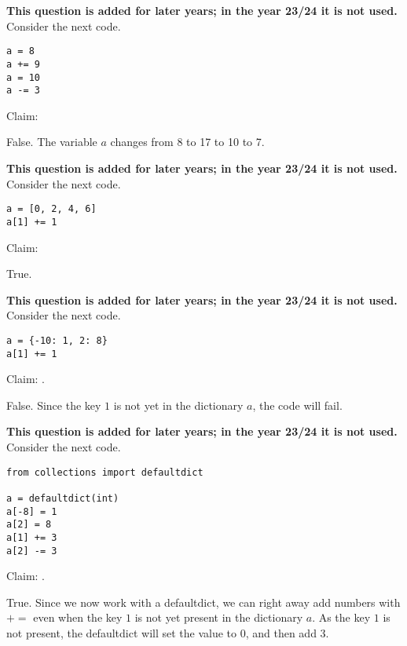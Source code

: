 \documentclass[stochastic-or.tex]{subfiles}
\begin{document}
\begin{truefalse} \textbf{This question is added for later years; in the year 23/24 it is not used.}
Consider the next code.
\begin{verbatim}
a = 8
a += 9
a = 10
a -= 3
\end{verbatim}
Claim:  
\begin{solution}
False. The variable $a$ changes from 8 to 17 to 10 to 7.
\end{solution}
\end{truefalse}

\begin{truefalse} \textbf{This question is added for later years; in the year 23/24 it is not used.}
Consider the next code.
\begin{verbatim}
a = [0, 2, 4, 6]
a[1] += 1
\end{verbatim}
Claim:  
\begin{solution}
True.
\end{solution}
\end{truefalse}

\begin{truefalse} \textbf{This question is added for later years; in the year 23/24 it is not used.}
Consider the next code.
\begin{verbatim}
a = {-10: 1, 2: 8}
a[1] += 1
\end{verbatim}
Claim:  .
\begin{solution}
False. Since the key $1$ is not yet in the dictionary $a$, the code will fail.
\end{solution}
\end{truefalse}

\begin{truefalse} \textbf{This question is added for later years; in the year 23/24 it is not used.}
Consider the next code.
\begin{verbatim}
from collections import defaultdict

a = defaultdict(int)
a[-8] = 1
a[2] = 8
a[1] += 3
a[2] -= 3
\end{verbatim}
Claim:  .
\begin{solution}
True. Since we now work with a defaultdict, we can right away add numbers with $+=$ even when the key $1$ is not yet present in the dictionary $a$. As the key $1$  is not present, the defaultdict will set the value to 0, and then add 3.
\end{solution}
\end{truefalse}
\end{document}
